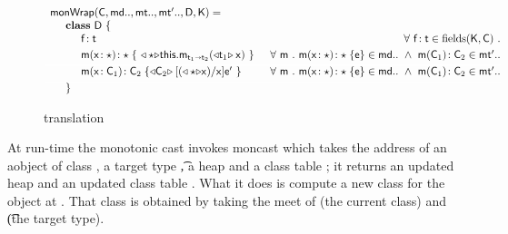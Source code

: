 \documentclass[sigconf]{acmart}
\begin{document}
\begin{figure*}[!t]
\begin{mathpar}

\end{mathpar}


\begin{mathpar}


\end{mathpar}

\[\begin{array}{l@{~}r@{}r@{~}r@{~}r@{~}rr}
\arrayrulecolor{white}
\classgen{\C, \md.., \mt.., \mtp.., \D, \K}= \\
  \SP \class~\D~\{ \\
    \SPP \Fdef\f\t   &
        \All{\f\!:\t\in\text{fields}(\K,\C)} \\[1mm]
    \SPP \Mdef\m\x\any\any{~\MonCast\any{\KCall\this\m{\MonCast{\t[1]}\x}{\t[1]}{\t[2]}}~}\HS\HS & 
          \All\m \Mdef\m\x{\any}{\any}\e\in\md..  ~\AND~ \Mtype\m{\C_1}{\C_2}\in{\mtp..}
\\[1mm]\hline
\SPP \Mdef\m\x{\C_1}{\C_2} {\MonCast{\C_2}{[{(\MonCast{\any}\x)}/\x]\ep}~}
&     \All \m \Mdef\m\x{\any}{\any}\e\in\md.. ~\AND~ \Mtype\m{\C_1}{\C_2}\in\mtp.. 
\\[1mm]\hline
\SP\}
\end{array}
\]

\caption{translation}
\end{figure*}

At run-time the monotonic cast invokes moncast which takes the address \a of
an aobject of class \C, a target type \t, a heap \Env and a class table \K;
it returns an updated heap \Envp and an updated class table \Kp. What it
does is compute a new class \Cp for the object at \a. That class is obtained
by taking the meet of \C (the current class) and \t (the target type).
\end{document}
